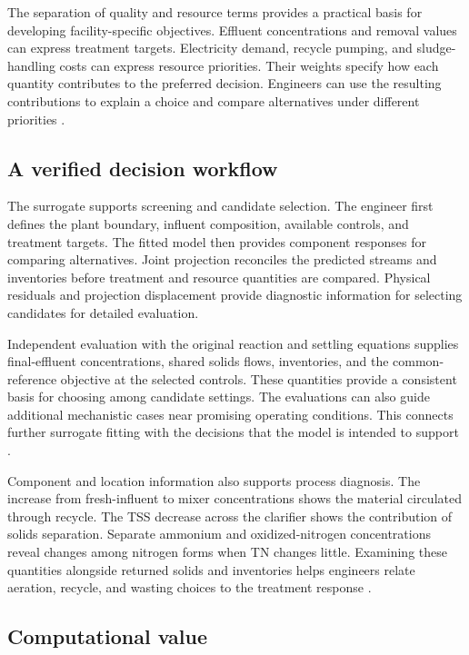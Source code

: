 The separation of quality and resource terms provides a practical basis for developing facility-specific objectives. Effluent concentrations and removal values can express treatment targets. Electricity demand, recycle pumping, and sludge-handling costs can express resource priorities. Their weights specify how each quantity contributes to the preferred decision. Engineers can use the resulting contributions to explain a choice and compare alternatives under different priorities \citep{PadronPaez2020,Miederer2025}.

\subsection{A verified decision workflow}

The surrogate supports screening and candidate selection. The engineer first defines the plant boundary, influent composition, available controls, and treatment targets. The fitted model then provides component responses for comparing alternatives. Joint projection reconciles the predicted streams and inventories before treatment and resource quantities are compared. Physical residuals and projection displacement provide diagnostic information for selecting candidates for detailed evaluation.

Independent evaluation with the original reaction and settling equations supplies final-effluent concentrations, shared solids flows, inventories, and the common-reference objective at the selected controls. These quantities provide a consistent basis for choosing among candidate settings. The evaluations can also guide additional mechanistic cases near promising operating conditions. This connects further surrogate fitting with the decisions that the model is intended to support \citep{Alexandrov1998,Hameed2026}.

Component and location information also supports process diagnosis. The increase from fresh-influent to mixer concentrations shows the material circulated through recycle. The TSS decrease across the clarifier shows the contribution of solids separation. Separate ammonium and oxidized-nitrogen concentrations reveal changes among nitrogen forms when TN changes little. Examining these quantities alongside returned solids and inventories helps engineers relate aeration, recycle, and wasting choices to the treatment response \citep{Henze2006,Alex2008,JeppssonDiehl1996}.

\subsection{Computational value}

